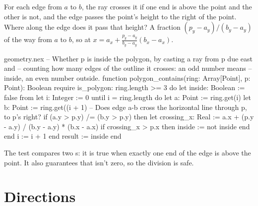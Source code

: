 \begin{center}
\end{center}

For each edge from $a$ to $b$, the ray crosses it if one end is above the
point and the other is not, and the edge passes the point's height to the
right of the point. Where along the edge does it pass that height? A
fraction $(p_y - a_y)/(b_y - a_y)$ of the way from $a$ to $b$, so at
$x = a_x + \frac{p_y - a_y}{b_y - a_y}(b_x - a_x)$.

\begin{append}{geometry.nex}
-- Whether p is inside the polygon, by casting a ray from p due east and
-- counting how many edges of the outline it crosses: an odd number means
-- inside, an even number outside.
function polygon_contains(ring: Array[Point], p: Point): Boolean
require
  is_polygon: ring.length >= 3
do
  let inside: Boolean := false
  from
    let i: Integer := 0
  until
    i = ring.length
  do
    let a: Point := ring.get(i)
    let b: Point := ring.get((i + 1) %
    -- Does edge a-b cross the horizontal line through p, to p's right?
    if (a.y > p.y) /= (b.y > p.y) then
      let crossing_x: Real := a.x + (p.y - a.y) / (b.y - a.y) * (b.x - a.x)
      if crossing_x > p.x then
        inside := not inside
      end
    end
    i := i + 1
  end
  result := inside
end
\end{append}

The test  compares two s:
it is true when exactly one end of the edge is above the point. It also
guarantees that  isn't zero, so the division is safe.

\section{Directions}

